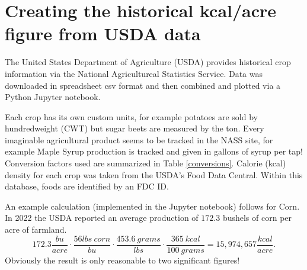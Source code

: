 \documentclass[onecolumn]{article}
\newcommand{\be}{\begin{equation}}
\newcommand{\ee}{\end{equation}}
\begin{document}
\clearpage
\newpage

\section{Creating the historical kcal/acre figure from USDA data}
\label{how_yield_plot_is_made}
The United States Department of Agriculture (USDA) provides historical crop information via the National Agricultureal Statistics Service.\cite{USDA_NASS}
Data was downloaded in spreadsheet csv format and then combined and plotted via a Python Jupyter notebook.   

Each crop has its own custom units, for example potatoes are sold by hundredweight (CWT) but sugar beets are measured by the ton.  
Every imaginable agricultural product seems to be tracked in the NASS site, for example Maple Syrup production is tracked and given in gallons of syrup per tap! 
Conversion factors used are summarized in Table \ref{conversions}.  
Calorie (kcal) density for each crop was taken from the USDA's Food Data Central.\cite{USDA_FDC}
Within this database, foods are identified by an FDC ID.  

An example calculation (implemented in the Jupyter notebook) follows for Corn.  
In 2022 the USDA reported an average production of $172.3$ bushels of corn per acre of farmland.  
\be
172.3\frac{bu}{acre}\cdot\frac{56lbs~corn}{bu}\cdot\frac{453.6~grams}{lbs}\cdot\frac{365~kcal}{100~grams} = 15,974,657 \frac{kcal}{acre} .
\label{example_calculation}
\ee
Obviously the result is only reasonable to two significant figures!
\end{document}
